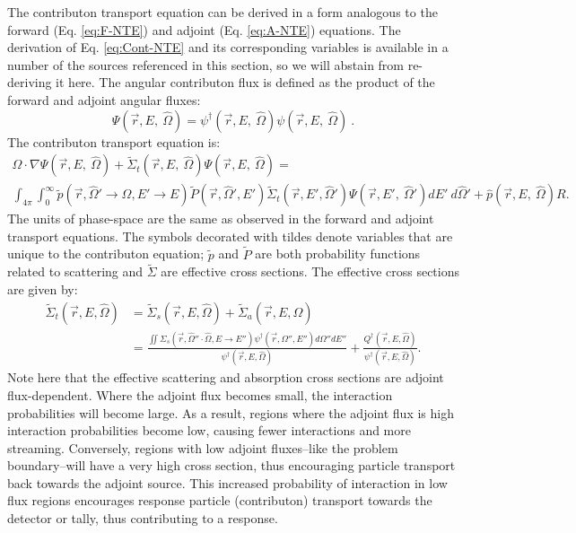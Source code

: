 The contributon transport equation can be derived in a form analogous
to the forward (Eq. \eqref{eq:F-NTE}) and adjoint (Eq. \eqref{eq:A-NTE}) equations.
The derivation of Eq. \eqref{eq:Cont-NTE} and its corresponding variables is
available in a number of the sources referenced in this section, so we will
abstain from re-deriving it here. The angular contributon flux is defined
as the product of the forward and
adjoint angular fluxes:
\begin{equation}
\Psi (\vec {r} ,E,\:\hat\Omega) = \psi^{\dagger} (\vec {r} ,E,\:\hat\Omega)
        \psi(\vec {r} ,E,\:\hat\Omega) \:.
\label{eq.Cont-Flux}
\end{equation}
The contributon transport equation is:
\begin{multline}
\hat\Omega \cdot \nabla \Psi (\vec {r} ,E,\:\hat\Omega)
+\widetilde{\Sigma} _{ t }(\vec{r},E,\:\hat\Omega)\Psi (\vec { r } ,E,\:\hat\Omega)
     = \\
        \int _{ 4\pi  } \int _{ 0 }^{ \infty  }
        \widetilde{p}(\vec{r}, \hat\Omega'\rightarrow\hat\Omega, E'\rightarrow E)
        \widetilde{P}(\vec{r}, \hat\Omega',E')
        \widetilde{\Sigma} _{ t }(\vec{r}, E', \hat\Omega')
        \Psi (\vec { r } ,E',\: \hat\Omega')dE' \:d\hat\Omega'
        + \hat p(\vec { r } ,E, \:\hat\Omega) R .
\label{eq:Cont-NTE}
\end{multline}
The units of phase-space are the same as observed in the forward and adjoint
transport equations. The symbols decorated with tildes denote variables that are
unique to the contributon equation; $\widetilde{p}$ and $\widetilde{P}$ are both
probability functions related to scattering and $\widetilde{\Sigma}$ are
effective cross sections.
The effective cross sections are given by:
\begin{equation}
\begin{aligned}
\widetilde{\Sigma}_{t}(\vec{r}, E, \hat\Omega) &=
        \widetilde{\Sigma}_{s}(\vec{r}, E, \hat\Omega) +
        \widetilde{\Sigma}_{a}(\vec{r}, E, \hat\Omega)    \\
     &= \frac{\iint \Sigma_{s}(\vec{r},\hat\Omega''\cdot\hat\Omega,
         E\rightarrow E'') \psi^{\dagger}
         (\vec{r}, \Omega'', E'') d\Omega'' dE''}
         {\psi^{\dagger}(\vec{r}, E, \hat\Omega)}
        + \frac{Q^{\dagger}(\vec{r}, E, \hat\Omega)}
        {\psi^{\dagger}(\vec{r}, E, \hat\Omega)}.
\end{aligned}
\end{equation}
Note here that the effective scattering and absorption cross sections are
adjoint flux-dependent. Where the adjoint flux becomes small, the interaction
probabilities will become large. As a result, regions where the adjoint flux
is high interaction probabilities become low, causing fewer interactions and
more streaming. Conversely, regions with low adjoint
fluxes--like the problem boundary--will have a very high cross section, thus
encouraging particle transport back towards the adjoint source. This
increased probability of interaction in low flux regions encourages response
particle (contributon)
transport towards the detector or tally, thus contributing to a response.

